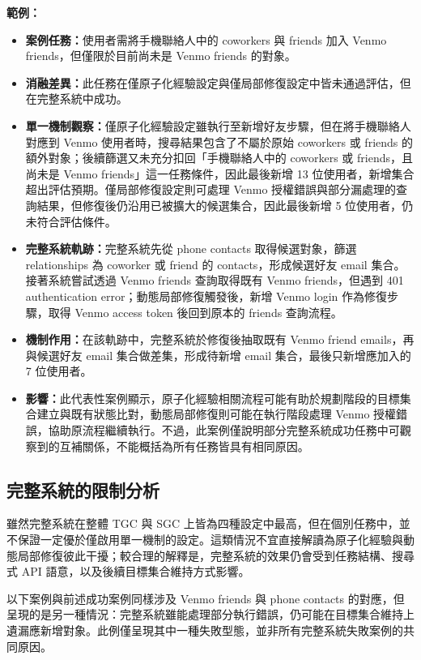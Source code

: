 \begin{ZhChapter}
\noindent\textbf{範例：}
\begin{itemize}
    \item \textbf{案例任務：}使用者需將手機聯絡人中的 coworkers 與 friends 加入 Venmo friends，但僅限於目前尚未是 Venmo friends 的對象。
    \item \textbf{消融差異：}此任務在僅原子化經驗設定與僅局部修復設定中皆未通過評估，但在完整系統中成功。
    \item \textbf{單一機制觀察：}僅原子化經驗設定雖執行至新增好友步驟，但在將手機聯絡人對應到 Venmo 使用者時，搜尋結果包含了不屬於原始 coworkers 或 friends 的額外對象；後續篩選又未充分扣回「手機聯絡人中的 coworkers 或 friends，且尚未是 Venmo friends」這一任務條件，因此最後新增 13 位使用者，新增集合超出評估預期。僅局部修復設定則可處理 Venmo 授權錯誤與部分漏處理的查詢結果，但修復後仍沿用已被擴大的候選集合，因此最後新增 5 位使用者，仍未符合評估條件。
    \item \textbf{完整系統軌跡：}完整系統先從 phone contacts 取得候選對象，篩選 relationships 為 coworker 或 friend 的 contacts，形成候選好友 email 集合。接著系統嘗試透過 Venmo friends 查詢取得既有 Venmo friends，但遇到 401 authentication error；動態局部修復觸發後，新增 Venmo login 作為修復步驟，取得 Venmo access token 後回到原本的 friends 查詢流程。
    \item \textbf{機制作用：}在該軌跡中，完整系統於修復後抽取既有 Venmo friend emails，再與候選好友 email 集合做差集，形成待新增 email 集合，最後只新增應加入的 7 位使用者。
    \item \textbf{影響：}此代表性案例顯示，原子化經驗相關流程可能有助於規劃階段的目標集合建立與既有狀態比對，動態局部修復則可能在執行階段處理 Venmo 授權錯誤，協助原流程繼續執行。不過，此案例僅說明部分完整系統成功任務中可觀察到的互補關係，不能概括為所有任務皆具有相同原因。
\end{itemize}
\subsection*{完整系統的限制分析}

雖然完整系統在整體 TGC 與 SGC 上皆為四種設定中最高，但在個別任務中，並不保證一定優於僅啟用單一機制的設定。這類情況不宜直接解讀為原子化經驗與動態局部修復彼此干擾；較合理的解釋是，完整系統的效果仍會受到任務結構、搜尋式 API 語意，以及後續目標集合維持方式影響。

以下案例與前述成功案例同樣涉及 Venmo friends 與 phone contacts 的對應，但呈現的是另一種情況：完整系統雖能處理部分執行錯誤，仍可能在目標集合維持上遺漏應新增對象。此例僅呈現其中一種失敗型態，並非所有完整系統失敗案例的共同原因。


\end{ZhChapter}
